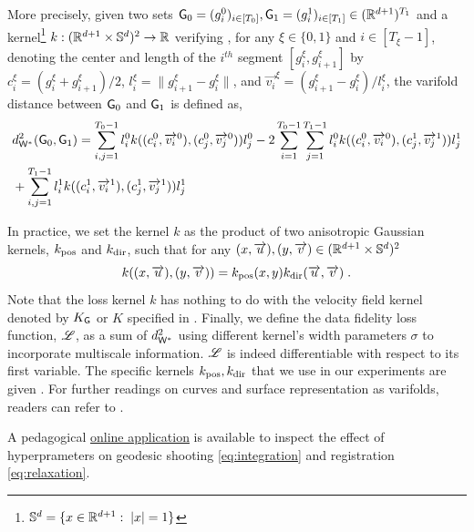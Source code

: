 More precisely, given two sets $\mathsf{G}_0=(g_i^0)_{i\in[T_0]},\mathsf{G}_1=(g_i^1)_{i\in[T_1]}\in (\mathbb{R}^{d+1})^{T_1}$ and a kernel\footnote{$\mathbb{S}^d=\{x\in\mathbb{R}^{d+1}:\; |x|=1\}$} $k:(\mathbb{R}^{d+1} \times \mathbb{S}^d)^2\to \mathbb{R}$ verifying \citep[Proposition 2 \& 4]{kaltenmark2017general}, for any $\xi\in\{0,1\}$ and $i\in[T_\xi-1]$, denoting the center and length of the $i^{th}$ segment $[g_i^\xi,g_{i+1}^\xi]$ by $c_i^\xi = (g_i^\xi + g_{i+1}^\xi)/2$, $l_i^\xi = \| g_{i+1}^\xi-g_{i}^\xi\|$, and 
$\overrightarrow{v_i}^\xi = (g_{i+1}^\xi-g_{i}^\xi)/l_i^\xi$, the varifold distance between $\mathsf{G}_0$ and $\mathsf{G}_1$  is defined as,
\begin{align}
  &d_{\mathsf{W}^*}^2(\mathsf{G}_0,\mathsf{G}_1) = \sum_{i,j = 1}^{T_0-1}l^0_i k((c^0_i,\overrightarrow{v_i}^0),(c^0_j,\overrightarrow{v_j}^0))l^0_j
  - 2 \sum_{i=1}^{T_0-1}\sum_{j=1}^{T_1-1}l^0_i k((c^0_i,\overrightarrow{v_i}^0),(c^1_j,\overrightarrow{v_j}^1))l^1_j \\
  &+ \sum_{i,j = 1}^{T_1-1}l^1_i k((c^1_i,\overrightarrow{v_i}^1),(c^1_j,\overrightarrow{v_j}^1))l^1_j 
\end{align}

In practice, we set the kernel $k$ as the product of two anisotropic Gaussian kernels, $k_{\mathrm{pos}}$ and $k_{\mathrm{dir}}$, 
such that for any $(x,\overrightarrow{u}),(y,\overrightarrow{v}) \in (\mathbb{R}^{d+1} \times \mathbb{S}^d)^2$
\begin{equation}
  k((x,\overrightarrow{u}),(y,\overrightarrow{v})) = k_{\mathrm{pos}}(x,y)k_{\mathrm{dir}}(\overrightarrow{u},\overrightarrow{v}) \;.
\end{equation}
Note that the loss kernel $k$ has nothing to do with the velocity field kernel denoted by $K_{\mathsf{G}}$ or $K$ specified in . Finally, we define the data fidelity loss function, $\mathscr{L}$, as a sum of $ d_{\mathsf{W}^*}^2$ using different kernel's width parameters $\sigma$ to incorporate multiscale information. $\mathscr{L}$ is indeed differentiable with respect to its first variable. The specific kernels $k_{\mathrm{pos}},k_{\mathrm{dir}}$ that we use in our experiments are given . For further readings on curves and surface representation as varifolds, readers can refer to \cite{kaltenmark2017general,charon2013varifold}. 

A pedagogical \href{https://tslddmmapp.streamlit.app}{\underline{online application}} is available to inspect the effect of hyperprameters on geodesic shooting \eqref{eq:integration} and registration \eqref{eq:relaxation}.
 
\vspace{-1ex}

\vspace{-1ex}

